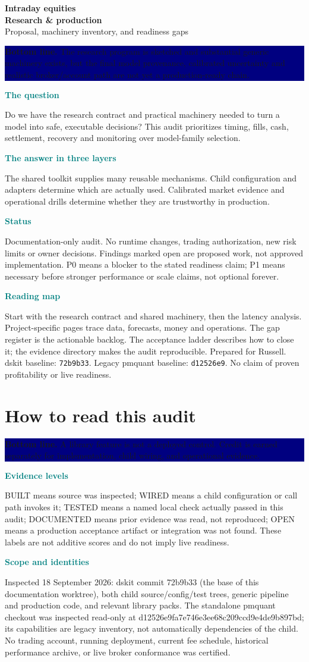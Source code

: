 \documentclass[10pt,letterpaper]{article}
\newcommand{\bl}[1]{\noindent\colorbox{navy}{\parbox{\dimexpr\linewidth-2\fboxsep}{\color{white}\textbf{Bottom line.} #1}}\par\medskip}
\newcommand{\topic}[2]{\clearpage\section{#1}\bl{#2}}
\newcommand{\sub}[1]{\par\textbf{\textcolor{teal}{#1}}\par}
\begin{document}
\thispagestyle{empty}
{\Huge\bfseries\color{navy}Intraday equities\\[8pt] Research \& production}\\[12pt]
{\Large Proposal, machinery inventory, and readiness gaps}\par\bigskip
\bl{The research program is sketched and substantial generic machinery exists, but the final model provenance, calibrated uncertainty and realistic broker/account path are not yet a production-ready chain.}
\sub{The question}
Do we have the research contract and practical machinery needed to turn a model into safe, executable decisions? This audit prioritizes timing, fills, cash, settlement, recovery and monitoring over model-family selection.
\sub{The answer in three layers}
The shared toolkit supplies many reusable mechanisms. Child configuration and adapters determine which are actually used. Calibrated market evidence and operational drills determine whether they are trustworthy in production.
\sub{Status}
Documentation-only audit. No runtime changes, trading authorization, new risk limits or owner decisions. Findings marked open are proposed work, not approved implementation. P0 means a blocker to the stated readiness claim; P1 means necessary before stronger performance or scale claims, not optional forever.
\sub{Reading map}
Start with the research contract and shared machinery, then the latency analysis. Project-specific pages trace data, forecasts, money and operations. The gap register is the actionable backlog. The acceptance ladder describes how to close it; the evidence directory makes the audit reproducible.
\vfill
{\small Prepared for Russell. dskit baseline: \texttt{72b9b33}. Legacy pmquant baseline: \texttt{d12526e9}. No claim of proven profitability or live readiness.}
\clearpage
{\small\tableofcontents}
\topic{How to read this audit}{A library feature is not a deployed control. Credit is earned separately for implementation, child wiring, and operational evidence.}
\sub{Evidence levels}
BUILT means source was inspected; WIRED means a child configuration or call path invokes it; TESTED means a named local check actually passed in this audit; DOCUMENTED means prior evidence was read, not reproduced; OPEN means a production acceptance artifact or integration was not found. These labels are not additive scores and do not imply live readiness.
\sub{Scope and identities}
Inspected 18 September 2026: dskit commit 72b9b33 (the base of this documentation worktree), both child source/config/test trees, generic pipeline and production code, and relevant library packs. The standalone pmquant checkout was inspected read-only at d12526e9fa7e746e3ee68c209ccd9e4de9b897bd; its capabilities are legacy inventory, not automatically dependencies of the child. No trading account, running deployment, current fee schedule, historical performance archive, or live broker conformance was certified.
\end{document}

